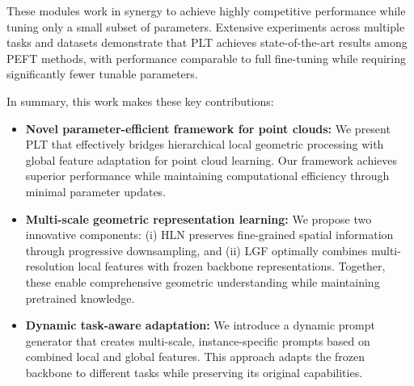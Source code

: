 These modules work in synergy to achieve highly competitive performance while tuning only a small subset of parameters. Extensive experiments across multiple tasks and datasets demonstrate that PLT achieves state-of-the-art results among PEFT methods, with performance comparable to full fine-tuning while requiring significantly fewer tunable parameters.


In summary, this work makes these key contributions:
\begin{itemize}
	\item \textbf{Novel parameter-efficient framework for point clouds:} We present PLT that effectively bridges hierarchical local geometric processing with global feature adaptation for point cloud learning. Our framework achieves superior performance while maintaining computational efficiency through minimal parameter updates.
	
	\item \textbf{Multi-scale geometric representation learning:} We propose two innovative components: (i) HLN preserves fine-grained spatial information through progressive downsampling, and (ii) LGF optimally combines multi-resolution local features with frozen backbone representations. Together, these enable comprehensive geometric understanding while maintaining pretrained knowledge.
	
	\item \textbf{Dynamic task-aware adaptation:} We introduce a dynamic prompt generator that creates multi-scale, instance-specific prompts based on combined local and global features. This approach adapts the frozen backbone to different tasks while preserving its original capabilities.
\end{itemize}



